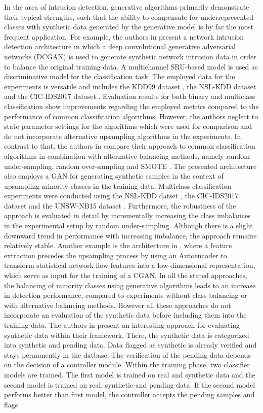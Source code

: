 \documentclass[../../main.tex]{subfiles}
\begin{document}
In the area of intrusion detection, generative algorithms primarily demonstrate their typical strengths, such that the ability to compensate for underrepresented classes with synthetic data generated by the generative model is by far the most frequent application. For example, the authors in \cite{8736331} present a network intrusion detection architecture in which a deep convolutional generative adversarial networks (DCGAN) is used to generate synthetic network intrusion data in order to balance the original training data. A multichannel SRU-based model is used as discriminative model for the classification task. The employed data for the experiments is versatile and includes the KDD99 dataset \cite{kdd99}, the NSL-KDD dataset \cite{nslkdd} and the CIC-IDS2017 dataset \cite{sharafaldin_toward_2018}. Evaluation results for both binary and multiclass classification show improvements regarding the employed metrics compared to the performance of common classification algorithms. However, the authors neglect to state parameter settings for the algorithms which were used for comparison and do not incorporate alternative upsampling algorithms in the experiments. In contrast to that, the authors in \cite{huang2020igan} compare their approach to common classification algorithms in combination with alternative balancing methods, namely random under-sampling, random over-sampling and SMOTE \cite{smote}. The presented architecture also employs a GAN for generating synthetic samples in the context of upsampling minority classes in the training data. Multiclass classification experiments were conducted using the NSL-KDD datset \cite{nslkdd}, the CIC-IDS2017 dataset \cite{sharafaldin_toward_2018} and the UNSW-NB15 dataset \cite{unswnb15}. Furthermore, the robustness of the approach is evaluated in detail by incrementally increasing the class imbalances in the experimental setup by random under-sampling. Although there is a slight downward trend in performance with increasing imbalance, the approach remains relatively stable. Another example is the architecture in \cite{lee2019ae}, where a feature extraction precedes the upsampling process by using an Autoencoder to transform statistical network flow features into a low-dimensional representation, which serve as input for the training of a CGAN. In all the stated approaches, the balancing of minority classes using generative algorithms leads to an increase in detection performance, compared to experiments without class balancing or with alternative balancing methods. However all these approaches do not incorporate an evaluation of the synthetic data before including them into the training data. The authors in \cite{shahriar2020g} present an interesting approach for evaluating synthetic data within their framework. There, the synthetic data is categorized into synthetic and pending data. Data flagged as synthetic is already verified and stays permanently in the datbase. The verification of the pending data depends on the decision of a controller module. Within the training phase, two classifier models are trained. The first model is trained on real and synthetic data and the second model is trained on real, synthetic and pending data. If the second model performs better than first model, the controller accepts the pending samples and flags 
\end{document}
